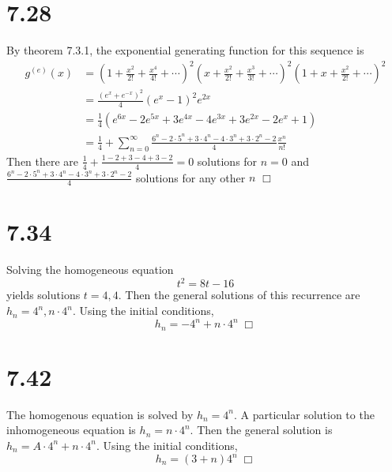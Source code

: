\documentclass{article}
\begin{document}
\section*{7.28}
By theorem 7.3.1, the exponential generating function for this sequence is
\begin{equation*}
\begin{split}
g^{(e)}(x) &= (1 + \frac{x^2}{2!} + \frac{x^4}{4!} + \cdots)^2(x + \frac{x^2}{2!} + \frac{x^3}{3!} + \cdots)^2(1 + x + \frac{x^2}{2!} + \cdots)^2\\
&= \frac{(e^x + e^{-x})^2}{4}(e^x - 1)^2e^{2x}\\
&= \frac{1}{4} \left( e^{6x} -2e^{5x} + 3e^{4x} - 4e^{3x} + 3e^{2x} - 2e^x + 1 \right)\\
&= \frac{1}{4} + \sum_{n=0}^\infty \frac{6^n - 2 \cdot 5^n + 3 \cdot 4^n - 4 \cdot 3^n + 3 \cdot 2^n - 2}{4} \frac{x^n}{n!}
\end{split}
\end{equation*}
Then there are $\frac{1}{4} + \frac{1 - 2 + 3 - 4 + 3 - 2}{4} = 0$ solutions for $n = 0$ and $\frac{6^n - 2 \cdot 5^n + 3 \cdot 4^n - 4 \cdot 3^n + 3 \cdot 2^n - 2}{4}$ solutions for any other $n$ $\Box$

\section*{7.34}
Solving the homogeneous equation
$$t^2 = 8t - 16$$
yields solutions $t = 4, 4$. Then the general solutions of this recurrence are $h_n = 4^n, n \cdot 4^n$. Using the initial conditions,
$$h_n = -4^n + n \cdot 4^n \; \Box$$

\section*{7.42}
The homogenous equation is solved by $h_n = 4^n$. A particular solution to the inhomogeneous equation is $h_n = n \cdot 4^n$. Then the general solution is $h_n = A \cdot 4^n + n \cdot 4^n$. Using the initial conditions,
$$h_n = (3 + n) 4^n \; \Box$$
\end{document}
